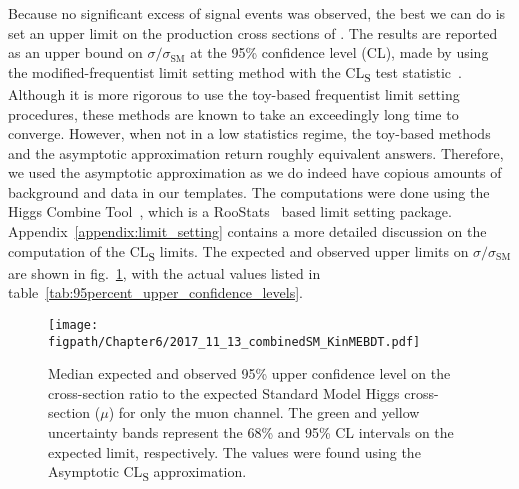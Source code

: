 Because no significant excess of signal events was observed, the best we can do is set an upper limit on the production cross sections of \HWWlvjj.
The results are reported as an upper bound on $\sigma/\sigma_{\text{SM}}$ at the 95\% confidence level (CL), made by using the modified-frequentist limit setting method with the CL\textsubscript{S} test statistic~\cite{Read:presentation,Junk,LHC-HCG}.
Although it is more rigorous to use the toy-based frequentist limit setting procedures, these methods are known to take an exceedingly long time to converge.
However, when not in a low statistics regime, the toy-based methods and the asymptotic approximation return roughly equivalent answers.
Therefore, we used the asymptotic approximation as we do indeed have copious amounts of background and data in our templates.
The computations were done using the Higgs Combine Tool~\cite{HiggsCombineTwiki}, which is a RooStats~\cite{Schott:2012zb} based limit setting package.
Appendix~\ref{appendix:limit_setting} contains a more detailed discussion on the computation of the CL\textsubscript{S} limits.
The expected and observed upper limits on $\sigma/\sigma_{\text{SM}}$ are shown in fig.~\ref{fig:limits_withSys_muon}, with the actual values listed in table~\ref{tab:95percent_upper_confidence_levels}.

\begin{comment}
Rishi:
The p-value of the excess at 125 GeV is 3.2σ.

To quantify, how probable the observed excess of events is above the background fluctuations the combined p-value is computed for the best-fit Higgs mass of 124.7GeV with a statistical significance of 5.65σ
\end{comment}

\begin{figure}[!hbt]
    \centering
    \texttt{[image: \\figpath/Chapter6/2017\_11\_13\_combinedSM\_KinMEBDT.pdf]}
    \caption{Median expected and observed 95\% upper confidence level on the cross-section ratio to the expected Standard Model Higgs cross-section ($\mu$) for only the muon channel. The green and yellow uncertainty bands represent the 68\% and 95\% CL intervals on the expected limit, respectively. The values were found using the Asymptotic CL\textsubscript{S} approximation.}
    \label{fig:limits_withSys_muon}
\end{figure}

